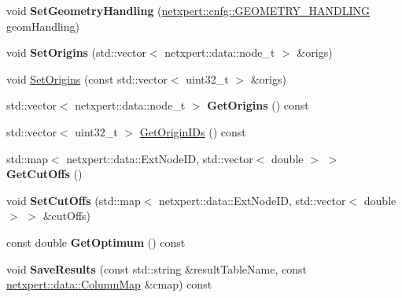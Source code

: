 \begin{DoxyCompactItemize}
\item 
void {\bfseries Set\+Geometry\+Handling} (\hyperlink{namespacenetxpert_1_1cnfg_a1514d3ae51414bf0bcd8d1fe8e868b89}{netxpert\+::cnfg\+::\+G\+E\+O\+M\+E\+T\+R\+Y\+\_\+\+H\+A\+N\+D\+L\+I\+NG} geom\+Handling)\hypertarget{classnetxpert_1_1Isolines_a4da1c3178b82c9224e96813618881a18}{}\label{classnetxpert_1_1Isolines_a4da1c3178b82c9224e96813618881a18}

\item 
void {\bfseries Set\+Origins} (std\+::vector$<$ netxpert\+::data\+::node\+\_\+t $>$ \&origs)\hypertarget{classnetxpert_1_1Isolines_ab8f7eeafad0d22c4aa22907c6e435b44}{}\label{classnetxpert_1_1Isolines_ab8f7eeafad0d22c4aa22907c6e435b44}

\item 
void \hyperlink{classnetxpert_1_1Isolines_a268f8d2922cc0a95f48255fd185e95dd}{Set\+Origins} (const std\+::vector$<$ uint32\+\_\+t $>$ \&origs)
\item 
std\+::vector$<$ netxpert\+::data\+::node\+\_\+t $>$ {\bfseries Get\+Origins} () const \hypertarget{classnetxpert_1_1Isolines_aa8e03b9b563a9c6e9f38d1715d73be4a}{}\label{classnetxpert_1_1Isolines_aa8e03b9b563a9c6e9f38d1715d73be4a}

\item 
std\+::vector$<$ uint32\+\_\+t $>$ \hyperlink{classnetxpert_1_1Isolines_a8f20bea3e7cb0f0ce5d6e425e96a8453}{Get\+Origin\+I\+Ds} () const 
\item 
std\+::map$<$ netxpert\+::data\+::\+Ext\+Node\+ID, std\+::vector$<$ double $>$ $>$ {\bfseries Get\+Cut\+Offs} ()\hypertarget{classnetxpert_1_1Isolines_a43c9e00fa69a07cc9ed63faf370a7db6}{}\label{classnetxpert_1_1Isolines_a43c9e00fa69a07cc9ed63faf370a7db6}

\item 
void {\bfseries Set\+Cut\+Offs} (std\+::map$<$ netxpert\+::data\+::\+Ext\+Node\+ID, std\+::vector$<$ double $>$ $>$ \&cut\+Offs)\hypertarget{classnetxpert_1_1Isolines_a43a9387e53fc990cab17a32d8a1e43de}{}\label{classnetxpert_1_1Isolines_a43a9387e53fc990cab17a32d8a1e43de}

\item 
const double {\bfseries Get\+Optimum} () const \hypertarget{classnetxpert_1_1Isolines_a83ed59ee0cab81a47819079daef06659}{}\label{classnetxpert_1_1Isolines_a83ed59ee0cab81a47819079daef06659}

\item 
void {\bfseries Save\+Results} (const std\+::string \&result\+Table\+Name, const \hyperlink{structnetxpert_1_1data_1_1ColumnMap}{netxpert\+::data\+::\+Column\+Map} \&cmap) const \hypertarget{classnetxpert_1_1Isolines_aded20cf087ab22f36a7c718c5b0231c9}{}\label{classnetxpert_1_1Isolines_aded20cf087ab22f36a7c718c5b0231c9}


\end{DoxyCompactItemize}

